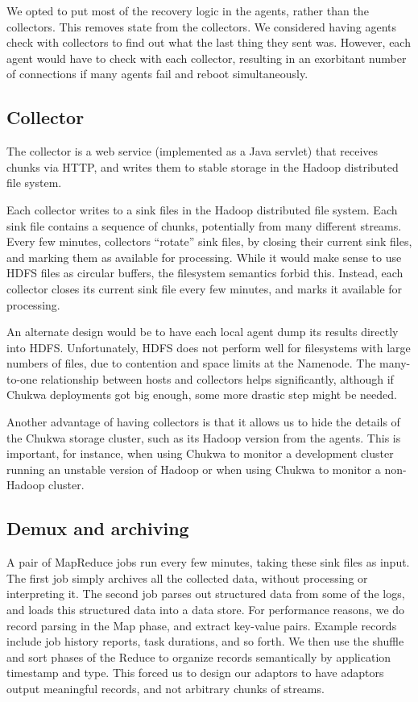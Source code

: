 \documentclass[letterpaper,twocolumn,10pt]{article}
\begin{document}
We opted to put most of the recovery logic in the agents, rather than the collectors. This removes state from the collectors. We considered having agents check with collectors to find out what the last thing they sent was. However, each agent would have to check with each collector, resulting in an exorbitant number of connections if many agents fail and reboot simultaneously.

\subsection{Collector}

The collector is a web service (implemented as a Java servlet) that receives chunks via HTTP, and writes them to stable storage in the Hadoop distributed file system.  

Each collector writes to a sink files in the Hadoop distributed file system. Each sink file contains a sequence of chunks, potentially from many different streams.  Every few minutes, collectors ``rotate'' sink files, by closing their current sink files, and marking them as available for processing. While it would make sense to use HDFS files as circular buffers, the filesystem semantics forbid this.  Instead, each collector closes its current sink file every few minutes, and marks it available for processing.  

An alternate design would be to have each local agent dump its results directly into HDFS. Unfortunately, HDFS does not perform well for filesystems with large numbers of files, due to contention and space limits at the Namenode.  The many-to-one relationship between hosts and collectors helps significantly, although if Chukwa deployments got big enough, some more drastic step might be needed.

Another advantage of having collectors is that it allows us to hide the details of the Chukwa storage cluster, such as its Hadoop version from the agents.  This is important, for instance, when using Chukwa to monitor a development cluster running an unstable version of Hadoop or when using Chukwa to monitor a non-Hadoop cluster.  

\subsection{Demux and archiving}

A pair of MapReduce jobs run every few minutes, taking these sink files as input.  The first job simply archives all the collected data, without processing or interpreting it.  The second job parses out structured data from some of the logs, and loads this structured data into a data store.   For performance reasons, we do record parsing in the Map phase, and extract key-value pairs. Example records include job history reports, task durations, and so forth. We then use the shuffle and sort phases of the Reduce to organize records semantically by application timestamp and type. This forced us to design our adaptors to have adaptors output meaningful records, and not arbitrary chunks of streams. %
\end{document}
